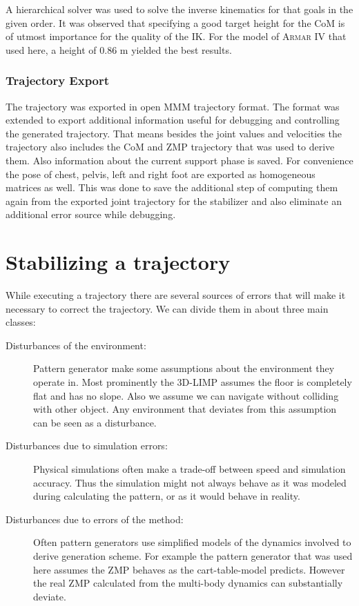 \documentclass[english,ngerman]{KITreprt}
\newcommand{\name}[1]{\textsc{#1}}
\begin{document}
A hierarchical solver was used to solve the inverse kinematics for that
goals in the given order. It was observed that specifying a good target
height for the CoM is of utmost importance for the quality of the IK.
For the model of \name{Armar IV} that used here, a height of $0.86$ m
yielded the best results.

\subsection{Trajectory Export}\label{trajectory-export}

The trajectory was exported in open \name{MMM} trajectory format. The
format was extended to export additional information useful for
debugging and controlling the generated trajectory. That means besides
the joint values and velocities the trajectory also includes the CoM and
ZMP trajectory that was used to derive them. Also information about the
current support phase is saved. For convenience the pose of chest,
pelvis, left and right foot are exported as homogeneous matrices as
well. This was done to save the additional step of computing them again
from the exported joint trajectory for the stabilizer and also eliminate
an additional error source while debugging.

\chapter{Stabilizing a trajectory}\label{stabilizing-a-trajectory}

While executing a trajectory there are several sources of errors that
will make it necessary to correct the trajectory. We can divide them in
about three main classes:

\begin{description}
\item[Disturbances of the environment:]
Pattern generator make some assumptions about the environment they
operate in. Most prominently the 3D-LIMP assumes the floor is completely
flat and has no slope. Also we assume we can navigate without colliding
with other object. Any environment that deviates from this assumption
can be seen as a disturbance.
\item[Disturbances due to simulation errors:]
Physical simulations often make a trade-off between speed and simulation
accuracy. Thus the simulation might not always behave as it was modeled
during calculating the pattern, or as it would behave in reality.
\item[Disturbances due to errors of the method:]
Often pattern generators use simplified models of the dynamics involved
to derive generation scheme. For example the pattern generator that was
used here assumes the ZMP behaves as the cart-table-model predicts.
However the real ZMP calculated from the multi-body dynamics can
substantially deviate.
\end{description}
\end{document}
